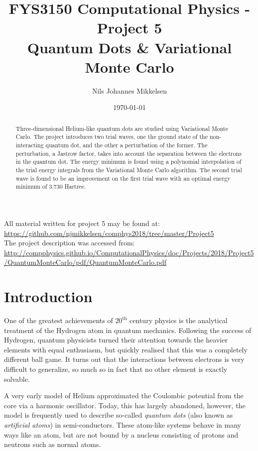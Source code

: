 \documentclass[nofootinbib,reprint,english]{revtex4-1}
\begin{document}
\title{FYS3150 Computational Physics - Project 5\\Quantum Dots \& Variational Monte Carlo}
\author{Nils Johannes Mikkelsen}
\date{\today}
\noaffiliation
\begin{abstract}
Three-dimensional Helium-like quantum dots are studied using Variational Monte Carlo. The project introduces two trial waves, one the ground state of the non-interacting quantum dot, and the other a perturbation of the former. The perturbation, a Jastrow factor, takes into account the separation between the electrons in the quantum dot. The energy minimum is found using a polynomial interpolation of the trial energy integrals from the Variational Monte Carlo algorithm. The second trial wave is found to be an improvement on the first trial wave with an optimal energy minimum of 3.730 Hartree.
\end{abstract}
\maketitle
\noindent All material written for project 5 may be found at:\\
{\scriptsize\url{https://github.com/njmikkelsen/comphys2018/tree/master/Project5}}\\
The project description was accessed from:\\
{\scriptsize\url{http://compphysics.github.io/ComputationalPhysics/doc/Projects/2018/Project5/QuantumMonteCarlo/pdf/QuantumMonteCarlo.pdf}}
\section{Introduction}
One of the greatest achievements of \(20^\text{th}\) century physics is the analytical treatment of the Hydrogen atom in quantum mechanics. Following the success of Hydrogen, quantum physicists turned their attention towards the heavier elements with equal enthusiasm, but quickly realised that this was a completely different ball game. It turns out that the interactions between electrons is very difficult to generalize, so much so in fact that no other element is exactly solvable.

A very early model of Helium approximated the Coulombic potential from the core via a harmonic oscillator. Today, this has largely abandoned, however, the model is frequently used to describe so-called \emph{quantum dots} (also known as \emph{artificial atoms}) in semi-conductors. These atom-like systems behave in many ways like an atom, but are not bound by a nucleus consisting of protons and neutrons such as normal atoms.
\end{document}
